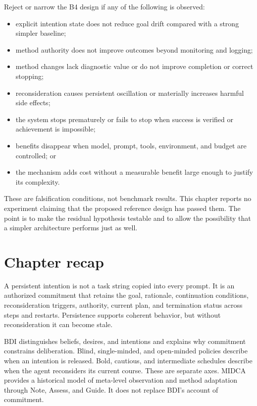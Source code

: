 Reject or narrow the B4 design if any of the following is observed:

\begin{itemize}
  \item explicit intention state does not reduce goal drift compared with a strong simpler baseline;
  \item method authority does not improve outcomes beyond monitoring and logging;
  \item method changes lack diagnostic value or do not improve completion or correct stopping;
  \item reconsideration causes persistent oscillation or materially increases harmful side effects;
  \item the system stops prematurely or fails to stop when success is verified or achievement is impossible;
  \item benefits disappear when model, prompt, tools, environment, and budget are controlled; or
  \item the mechanism adds cost without a measurable benefit large enough to justify its complexity.
\end{itemize}

These are falsification conditions, not benchmark results. This chapter reports no experiment claiming that the proposed reference design has passed them. The point is to make the residual hypothesis testable and to allow the possibility that a simpler architecture performs just as well.

\section{Chapter recap}
\label{sec:ch15-recap}

A persistent \gls{intention} is not a task string copied into every prompt. It is an authorized commitment that retains the goal, rationale, continuation conditions, reconsideration triggers, authority, current plan, and termination status across steps and restarts. Persistence supports coherent behavior, but without reconsideration it can become stale.

BDI distinguishes beliefs, desires, and intentions and explains why commitment constrains deliberation. Blind, single-minded, and open-minded policies describe when an intention is released. Bold, cautious, and intermediate schedules describe when the agent reconsiders its current course. These are separate axes. MIDCA provides a historical model of meta-level observation and method adaptation through Note, Assess, and Guide. It does not replace BDI's account of commitment.

